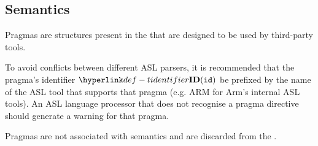 \FormallyParagraph
\begin{mathpar}
\end{mathpar}

\subsection{Semantics\label{sec:PragmaSemantics}}

\ProseParagraph
Pragmas are structures present in the \untypedast{} that are designed to be used
by third-party tools.

To avoid conflicts between different ASL parsers, it is recommended that the pragma's identifier $\Tidentifier(\id)$ be prefixed by the name of the ASL tool that supports that pragma
(e.g. ARM for Arm's internal ASL tools). An ASL language processor that does not recognise a pragma directive should generate a warning for that pragma.

Pragmas are not associated with semantics and are discarded from the \typedast.

